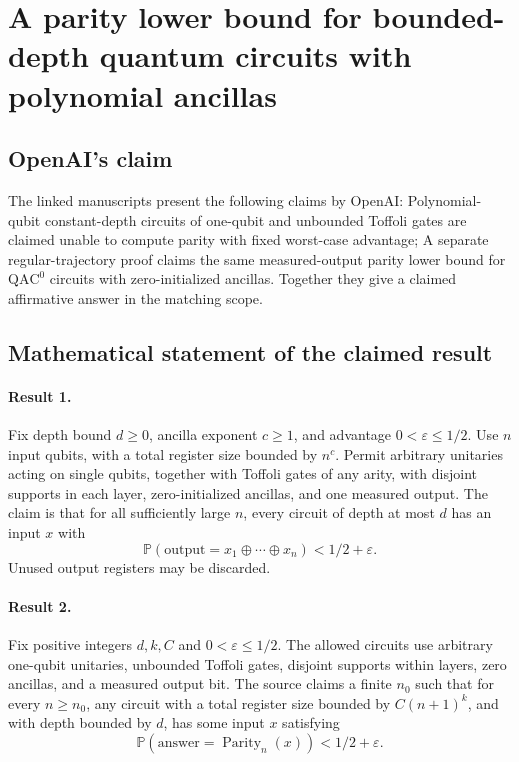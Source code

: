 \documentclass[11pt]{article}
\begin{document}
\section*{A parity lower bound for bounded-depth quantum circuits with polynomial ancillas}

\subsection{OpenAI's claim}
The linked manuscripts present the following claims by OpenAI: Polynomial-qubit constant-depth circuits of one-qubit and unbounded Toffoli gates are claimed unable to compute parity with fixed worst-case advantage; A separate regular-trajectory proof claims the same measured-output parity lower bound for $\mathrm{QAC}^0$ circuits with zero-initialized ancillas. Together they give a claimed affirmative answer in the matching scope.

\subsection{Mathematical statement of the claimed result}
\paragraph{Result 1.} Fix depth bound \(d\ge0\), ancilla exponent \(c\ge1\), and advantage \(0<\varepsilon\le1/2\). Use \(n\) input qubits, with a total register size bounded by \(n^c\). Permit arbitrary unitaries acting on single qubits, together with Toffoli gates of any arity, with disjoint supports in each layer, zero-initialized ancillas, and one measured output. The claim is that for all sufficiently large \(n\), every circuit of depth at most \(d\) has an input \(x\) with
\[
 \mathbb P(\text{output}=x_1\oplus\cdots\oplus x_n)<1/2+\varepsilon.
\]
Unused output registers may be discarded.

\paragraph{Result 2.} Fix positive integers \(d,k,C\) and \(0<\varepsilon\le1/2\). The allowed circuits use arbitrary one-qubit unitaries, unbounded Toffoli gates, disjoint supports within layers, zero ancillas, and a measured output bit. The source claims a finite \(n_0\) such that for every \(n\ge n_0\), any circuit with a total register size bounded by \(C(n+1)^k\), and with depth bounded by \(d\), has some input \(x\) satisfying
\[
 \mathbb P(\text{answer}=\operatorname{Parity}_n(x))<1/2+\varepsilon.
\]
\end{document}
